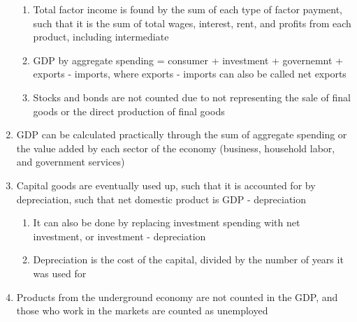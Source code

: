 \documentclass[11 pt, twoside]{article}
\begin{document}
\begin{enumerate}
\begin{enumerate}
\item Total factor income is found by the sum of each type of factor payment, such that it is the sum of total wages, interest, rent, and profits from each product, including intermediate
\item GDP by aggregate spending = consumer + investment + governemnt + exports - imports, where exports - imports can also be called net exports
\item Stocks and bonds are not counted due to not representing the sale of final goods or the direct production of final goods
\end{enumerate}
\item GDP can be calculated practically through the sum of aggregate spending or the value added by each sector of the economy (business, household labor, and government services)
\item Capital goods are eventually used up, such that it is accounted for by depreciation, such that net domestic product is GDP - depreciation
\begin{enumerate}
\item It can also be done by replacing investment spending with net investment, or investment - depreciation
\item Depreciation is the cost of the capital, divided by the number of years it was used for
\end{enumerate}
\item Products from the underground economy are not counted in the GDP, and those who work in the markets are counted as unemployed
\end{enumerate}
\end{document}
